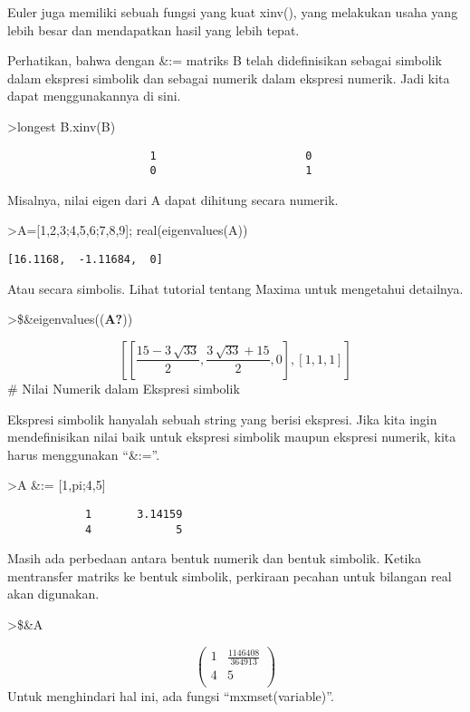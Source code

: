 \documentclass[
]{book}
\begin{document}
Euler juga memiliki sebuah fungsi yang kuat xinv(), yang melakukan usaha yang lebih besar dan mendapatkan hasil yang lebih tepat.

Perhatikan, bahwa dengan \&:= matriks B telah didefinisikan sebagai simbolik dalam ekspresi simbolik dan sebagai numerik dalam ekspresi numerik. Jadi kita dapat menggunakannya di sini.

\textgreater longest B.xinv(B)

\begin{verbatim}
                      1                       0 
                      0                       1 
\end{verbatim}

Misalnya, nilai eigen dari A dapat dihitung secara numerik.

\textgreater A={[}1,2,3;4,5,6;7,8,9{]}; real(eigenvalues(A))

\begin{verbatim}
[16.1168,  -1.11684,  0]
\end{verbatim}

Atau secara simbolis. Lihat tutorial tentang Maxima untuk mengetahui detailnya.

\textgreater\$\&eigenvalues((\textbf{A?}))

\[\left[ \left[ \frac{15-3\,\sqrt{33}}{2} , \frac{3\,\sqrt{33}+15}{2}
  , 0 \right]  , \left[ 1 , 1 , 1 \right]  \right] \]\# Nilai Numerik dalam Ekspresi simbolik

Ekspresi simbolik hanyalah sebuah string yang berisi ekspresi. Jika kita ingin mendefinisikan nilai baik untuk ekspresi simbolik maupun ekspresi numerik, kita harus menggunakan ``\&:=''.

\textgreater A \&:= {[}1,pi;4,5{]}

\begin{verbatim}
            1       3.14159 
            4             5 
\end{verbatim}

Masih ada perbedaan antara bentuk numerik dan bentuk simbolik. Ketika mentransfer matriks ke bentuk simbolik, perkiraan pecahan untuk bilangan real akan digunakan.

\textgreater\$\&A

\[\begin{pmatrix}1 & \frac{1146408}{364913} \\ 4 & 5 \\ \end{pmatrix}\]Untuk menghindari hal ini, ada fungsi ``mxmset(variable)''.
\end{document}
